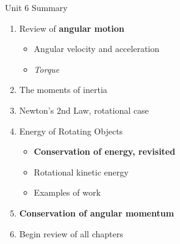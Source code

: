 \documentclass{beamer}
\begin{document}
\begin{frame}{Unit 6 Summary}
\begin{enumerate}
\item Review of \textbf{angular motion}
\begin{itemize}
\item Angular velocity and acceleration
\item \textit{Torque}
\end{itemize}
\item \alert{The moments of inertia}
\item Newton's 2nd Law, rotational case
\item Energy of Rotating Objects
\begin{itemize}
\item \textbf{Conservation of energy, revisited}
\item Rotational kinetic energy
\item Examples of work
\end{itemize}
\item \textbf{\alert{Conservation of angular momentum}}
\item Begin review of all chapters
\end{enumerate}
\end{frame}
\end{document}
